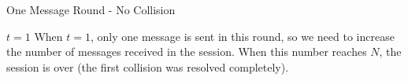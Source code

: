 \begin{frame}{One Message Round - No Collision}
    \begin{block}{$t = 1$}
        When $t = 1$, only one message is sent in this round, so we need to increase the number of messages received in the session. When this number reaches $N$, the session is over (the first collision was resolved completely).
    \end{block}
\end{frame}